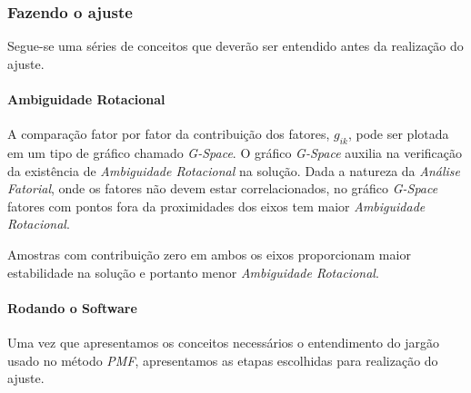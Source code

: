 \subsubsection{Fazendo o ajuste}

Segue-se uma séries de conceitos que deverão ser entendido antes da realização 
do ajuste. 

\paragraph{Ambiguidade Rotacional}

A comparação fator por fator da contribuição dos fatores, $g_{ik}$, 
pode ser plotada em um tipo de gráfico chamado \textit{G-Space}. 
O gráfico \textit{G-Space} auxilia na verificação da existência de 
\textit{Ambiguidade Rotacional} na solução. 
Dada a natureza da \textit{Análise Fatorial}, onde os fatores não devem estar 
correlacionados, no gráfico \textit{G-Space} fatores com pontos fora da 
proximidades dos eixos tem maior \textit{Ambiguidade Rotacional}. 

Amostras com contribuição zero em ambos os eixos proporcionam maior 
estabilidade na solução e portanto menor \textit{Ambiguidade Rotacional}. 

\paragraph{Rodando o Software}

Uma vez que apresentamos os conceitos necessários o entendimento do jargão 
usado no método \textit{PMF}, apresentamos as etapas escolhidas para realização 
do ajuste.


